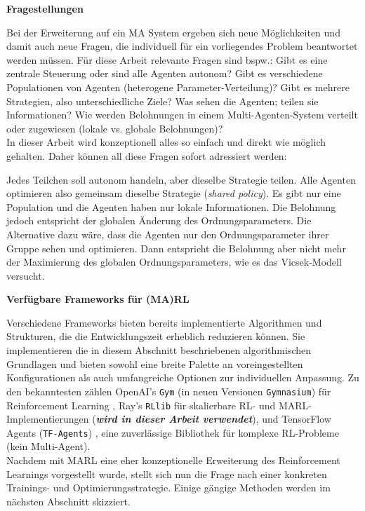 \documentclass{solutionclass}
\begin{document}
\textbf{Fragestellungen}

Bei der Erweiterung auf ein MA System ergeben sich neue Möglichkeiten und damit auch neue Fragen, die individuell für ein vorliegendes Problem beantwortet werden müssen. Für diese Arbeit relevante Fragen sind bspw.: Gibt es eine zentrale Steuerung oder sind alle Agenten autonom? Gibt es verschiedene Populationen von Agenten (heterogene Parameter-Verteilung)? Gibt es mehrere Strategien, also unterschiedliche Ziele? Was sehen die Agenten; teilen sie Informationen? Wie werden Belohnungen in einem Multi-Agenten-System verteilt oder zugewiesen (lokale vs. globale Belohnungen)? \\

In dieser Arbeit wird konzeptionell alles so einfach und direkt wie möglich gehalten. Daher können all diese Fragen sofort adressiert werden:

\begin{task}
    Jedes Teilchen soll autonom handeln, aber dieselbe Strategie teilen. Alle Agenten optimieren also gemeinsam dieselbe Strategie (\textit{shared policy}). Es gibt nur eine Population und die Agenten haben nur lokale Informationen. Die Belohnung jedoch entspricht der globalen Änderung des Ordnungsparameters. Die Alternative dazu wäre, dass die Agenten nur den Ordnungsparameter ihrer Gruppe sehen und optimieren. Dann entspricht die Belohnung aber nicht mehr der Maximierung des globalen Ordnungsparameters, wie es das Vicsek-Modell versucht.
\end{task}

\textbf{Verfügbare Frameworks für (MA)RL}

Verschiedene Frameworks bieten bereits implementierte Algorithmen und Strukturen, die die Entwicklungszeit erheblich reduzieren können. Sie implementieren die in diesem Abschnitt beschriebenen algorithmischen Grundlagen und bieten sowohl eine breite Palette an voreingestellten Konfigurationen als auch umfangreiche Optionen zur individuellen Anpassung. Zu den bekanntesten zählen OpenAI's \texttt{Gym} (in neuen Versionen \texttt{Gymnasium}) für Reinforcement Learning \cite{OpenAiGym}, Ray's \texttt{RLlib} für skalierbare RL- und MARL-Implementierungen \cite{RLlib} (\textbf{\textit{wird in dieser Arbeit verwendet}}), und TensorFlow Agents (\texttt{TF-Agents}) \cite{TFAgents}, eine zuverlässige Bibliothek für komplexe RL-Probleme (kein Multi-Agent).\\

Nachdem mit MARL eine eher konzeptionelle Erweiterung des Reinforcement Learnings vorgestellt wurde, stellt sich nun die Frage nach einer konkreten Trainings- und Optimierungsstrategie. Einige gängige Methoden werden im nächsten Abschnitt skizziert.
\end{document}
